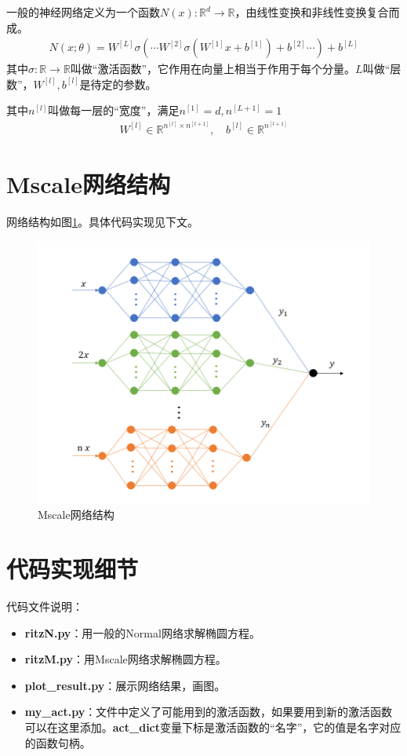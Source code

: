 \documentclass[12pt,a4paper]{article}
\begin{document}
一般的神经网络定义为一个函数$N(x): \mathbb{R}^d \rightarrow \mathbb{R}$，由线性变换和非线性变换复合而成。
\begin{align*}
N(x; \theta) = W^{[L]} \sigma(\cdots W^{[2]} \sigma(W^{[1]} x + b^{[1]}) + b^{[2]} \cdots) + b^{[L]}
\end{align*}
其中$\sigma: \mathbb{R} \rightarrow \mathbb{R}$叫做“激活函数”，它作用在向量上相当于作用于每个分量。$L$叫做“层数”，$W^{[l]}, b^{[l]}$是待定的参数。

其中$n^{[l]}$叫做每一层的“宽度”，满足$n^{[1]} = d, n^{[L+1]} = 1$
\begin{align*}
W^{[l]} \in \mathbb{R}^{n^{[l]} \times n^{[l+1]}}, \quad b^{[l]} \in \mathbb{R}^{n^{[l+1]}}
\end{align*}

\section*{Mscale网络结构}

网络结构\cite{mscale}如图\ref{net}。具体代码实现见下文。

\begin{figure}[h]
\centering
\includegraphics[width=0.5\linewidth]{MscaleNet2}
\caption{Mscale网络结构}
\label{net}
\end{figure}

\section*{代码实现细节}

代码文件说明：

\begin{itemize}
\item \textbf{ritzN.py}：用一般的Normal网络求解椭圆方程。
\item \textbf{ritzM.py}：用Mscale网络求解椭圆方程。
\item \textbf{plot\_result.py}：展示网络结果，画图。
\item \textbf{my\_act.py}：文件中定义了可能用到的激活函数，如果要用到新的激活函数可以在这里添加。\textbf{act\_dict}变量下标是激活函数的“名字”，它的值是名字对应的函数句柄。
\end{itemize}
\end{document}
